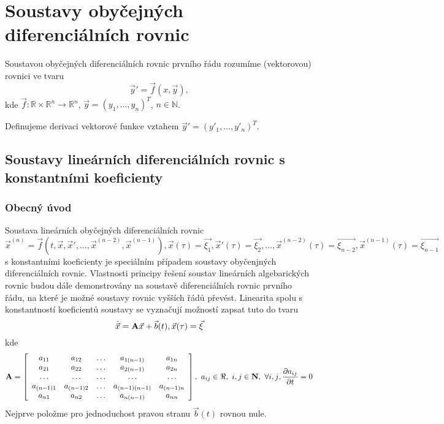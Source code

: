 
\chapter{Soustavy obyčejných diferenciálních rovnic}
Soustavou obyčejných diferenciálních rovnic prvního řádu rozumíme (vektorovou) rovnici ve tvaru
\[
   \vec{y}' = \vec{f}(x,\vec{y}),
\]
kde $\vec{f}:\mathbb{R}\times\mathbb{R}^n\rightarrow\mathbb{R}^n$, $\vec{y}=(y_1,\ldots,y_n)^T$, $n\in\mathbb{N}$.

Definujeme derivaci vektorové funkce vztahem $\vec{y}'=(y'_1,\ldots,y'_n)^T$.


\section{Soustavy lineárních diferenciálních rovnic s konstantními koeficienty}
\subsection{Obecný úvod}
Soustava lineárních obyčejných diferenciálních rovnic ${\vec{x}}^(n) = \vec{f}(t,\vec{x},\vec{x}',\ldots,\vec{x}^{(n-2)}, \vec{x}^{(n-1)}), \vec{x}(\tau) = \vec{\xi_1},\vec{x}'(\tau) = \vec{\xi_2},\ldots,\vec{x}^{(n-2)}(\tau) = \vec{\xi_{n-2}}, \vec{x}^{(n-1)}(\tau) = \vec{\xi_{n-1}}$ s konstantními koeficienty je speciálním případem soustavy obyčenjných diferenciálních rovnic. Vlastnosti principy řešení soustav lineárních algebarických rovnic budou dále demonstrovány na soustavě diferenciálních rovnic prvního řádu, na které je možné soustavy rovnic vyšších řádů převést.\newline
Linearita spolu s konstantností koeficientů soustavy se vyznačují možností zapsat tuto do tvaru 
\begin{equation}
  \dot{\vec{x}} = {\bf A} \vec{x} + \vec{b}(t), \vec{x}(\tau) = \vec{\xi}
  \label{EQ:soustava}
\end{equation}
kde 
\[
 {\bf A} = 
  \left[
    \begin{array}{ccccc}
     a_{11} & a_{12} & \ldots & a_{1(n-1)} & a_{1n} \\
     a_{21} & a_{22} & \ldots & a_{2(n-1)} & a_{2n} \\
     \ldots & \ldots & \ldots & \ldots & \ldots \\
     a_{(n-1)1} & a_{(n-1)2} & \ldots & a_{(n-1)(n-1)} & a_{(n-1)n} \\
     a_{n1} & a_{n2} & \ldots & a_{n(n-1)} & a_{nn} \\
    \end{array}
  \right],~a_{ij}\in\Re,~i,j\in{\bf N},~\forall{i,j},\frac{\partial a_{ij}}{\partial t} = 0
\]
Nejprve položme pro jednoduchost pravou stranu $\vec{b}(t)$ rovnou nule.

